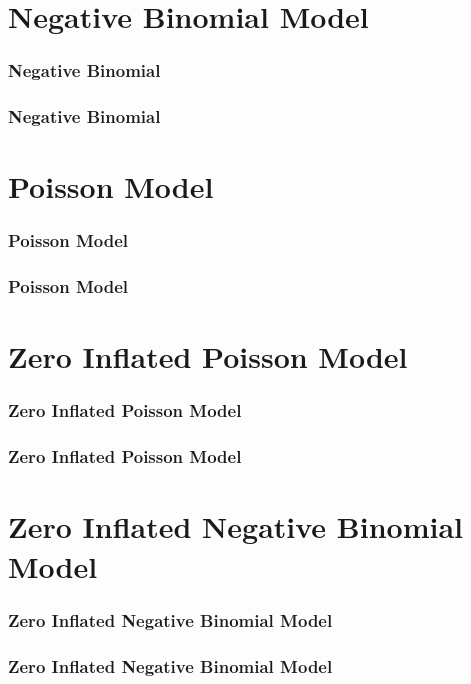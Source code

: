 \documentclass{beamer}
\begin{document}
	\section{Negative Binomial Model}
	\begin{frame}
		\frametitle{Negative Binomial}
	\end{frame}
	\begin{frame}
		\frametitle{Negative Binomial}
	\end{frame}
	
	\section{Poisson Model}
	\begin{frame}
		\frametitle{Poisson Model}
	\end{frame}
	\begin{frame}
		\frametitle{Poisson Model}
	\end{frame}
	
	\section{Zero Inflated Poisson Model}
	\begin{frame}
		\frametitle{Zero Inflated Poisson Model}
	\end{frame}
	\begin{frame}
		\frametitle{Zero Inflated Poisson Model}
	\end{frame}
	
	\section{Zero Inflated Negative Binomial Model}
	\begin{frame}
		\frametitle{Zero Inflated Negative Binomial Model}
	\end{frame}
	\begin{frame}
		\frametitle{Zero Inflated Negative Binomial Model}
	\end{frame}
	
\end{document}
